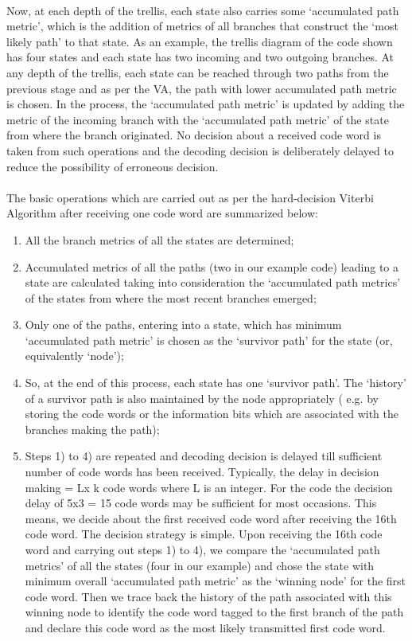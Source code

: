 \documentclass[14pt]{report}
\begin{document}
{\paragraph{} Now, at each depth of the trellis, each state also carries some ‘accumulated path metric’, which is the addition of metrics of all branches that construct the ‘most likely path’ to that state. As an example, the trellis diagram of the code shown has four states and each state has two incoming and two outgoing branches. At any depth of the trellis, each state can be reached through two paths from the previous stage and as per the VA, the path with lower accumulated path metric is chosen. In the process, the ‘accumulated path metric’ is updated by adding the metric of the incoming branch with the ‘accumulated path metric’ of the state from where the branch originated. No decision about a received code word is taken from such operations and the decoding decision is deliberately delayed to reduce the possibility of erroneous decision.
\paragraph{} The basic operations which are carried out as per the hard-decision Viterbi Algorithm after receiving one code word are summarized below:
\begin{enumerate}
\item All the branch metrics of all the states are determined;
\item 	 Accumulated metrics of all the paths (two in our example code) leading to a state are calculated taking into consideration the ‘accumulated path metrics’ of the states from where the most recent branches emerged;
\item Only one of the paths, entering into a state, which has minimum ‘accumulated path metric’ is chosen as the ‘survivor path’ for the state (or, equivalently ‘node’); 
\item So, at the end of this process, each state has one ‘survivor path’. The ‘history’ of a survivor path is also maintained by the node appropriately ( e.g. by storing the code words or the information bits which are associated with the branches making the path); 
\item Steps 1) to 4) are repeated and decoding decision is delayed till sufficient number of code words has been received. Typically, the delay in decision making = Lx k code words where L is an integer. For the code the decision delay of 5x3 = 15 code words may be sufficient for most occasions. This means, we decide about the first received code word after receiving the 16th code word. The decision strategy is simple. Upon receiving the 16th code word and carrying out steps 1) to 4), we compare the ‘accumulated path metrics’ of all the states (four in our example) and chose the state with minimum overall ‘accumulated path metric’ as the ‘winning node’ for the first code word. Then we trace back the history of the path associated with this winning node to identify the code word tagged to the first branch of the path and declare this code word as the most likely transmitted first code word.
\end{enumerate}
}
\end{document}
